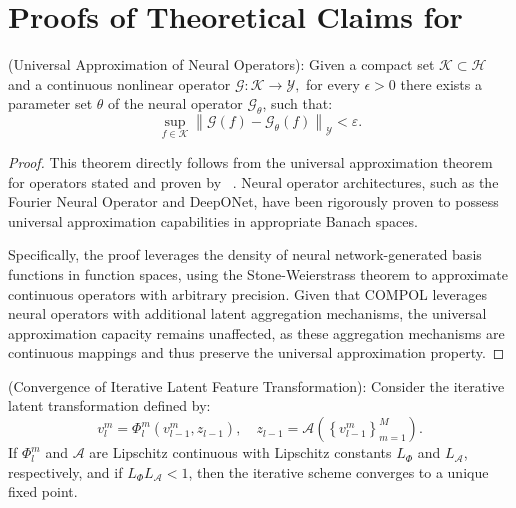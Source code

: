 \section{Proofs of Theoretical Claims for \ours}
\label{sec:appx-proofs}

\begin{theorem}
	(Universal Approximation of Neural Operators):
	Given a compact set $\mathcal{K} \subset \mathcal{H}$ and a continuous nonlinear operator $\mathcal{G}: \mathcal{K} \rightarrow \mathcal{Y},$ for every $\epsilon > 0$ there exists a parameter set $\theta$ of the neural operator $\mathcal{G}_\theta$, such that:
	\[
		\sup _{f \in \mathcal{K}}\left\|\mathcal{G}(f)-\mathcal{G}_\theta(f)\right\|_{\mathcal{Y}}<\varepsilon .
	\]
\end{theorem}

\begin{proof}
	This theorem directly follows from the universal approximation theorem for operators stated and proven by ~\cite{kovachki2023neural}. Neural operator architectures, such as the Fourier Neural Operator and DeepONet, have been rigorously proven to possess universal approximation capabilities in appropriate Banach spaces.
	
	Specifically, the proof leverages the density of neural network-generated basis functions in function spaces, using the Stone-Weierstrass theorem to approximate continuous operators with arbitrary precision. Given that COMPOL leverages neural operators with additional latent aggregation mechanisms, the universal approximation capacity remains unaffected, as these aggregation mechanisms are continuous mappings and thus preserve the universal approximation property.
\end{proof}

\begin{theorem}
	(Convergence of Iterative Latent Feature Transformation):
	Consider the iterative latent transformation defined by:
	\[
		v_l^m=\Phi_l^m\left(v_{l-1}^m, z_{l-1}\right), \quad z_{l-1}=\mathcal{A}\left(\left\{v_{l-1}^m\right\}_{m=1}^M\right) .
	\]
	If $\Phi_l^m$ and $\mathcal{A}$ are Lipschitz continuous with Lipschitz constants $L_{\Phi}$ and $L_{\mathcal{A}}$, respectively, and if $L_{\Phi}L_{\mathcal{A}} <1$, then the iterative scheme converges to a unique fixed point.
\end{theorem}


